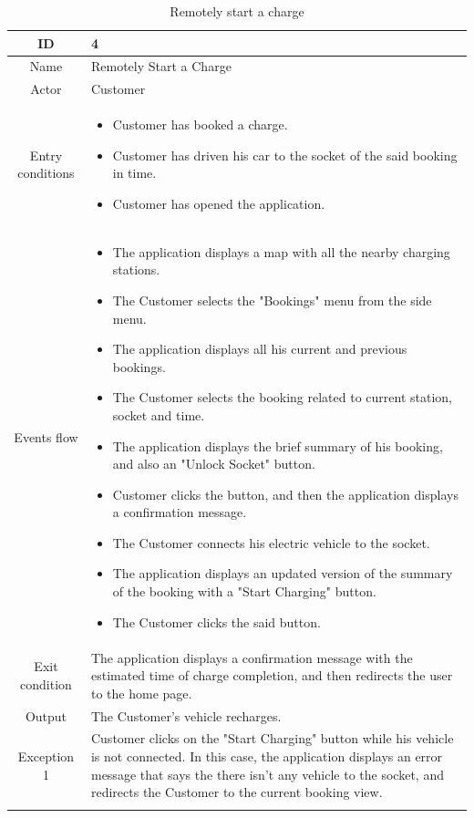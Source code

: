 \begin{longtable}{|c| p{10cm}|}
    \hline ID        & 4\\
    \hline
    Name     & Remotely Start a Charge \\
    \hline
    Actor            & Customer\\
    \hline
    Entry conditions & \begin{itemize}[nosep,after=\strut]
        \item Customer has booked a charge.
        \item Customer has driven his car to the socket of the said booking in time.
        \item Customer has opened the application.
    \end{itemize}
        \\
    \hline
    Events flow      & \begin{itemize}[nosep,after=\strut]
        \item The application displays a map with all the nearby charging stations.
        \item The Customer selects the "Bookings" menu from the side menu.
        \item The application displays all his current and previous bookings.
        \item The Customer selects the booking related to current station, socket and time.
        \item The application displays the brief summary of his booking, and also an "Unlock Socket" button.
        \item Customer clicks the button, and then the application displays a confirmation message. 
        \item The Customer connects his electric vehicle to the socket.
        \item The application displays an updated version of the summary of the booking with a "Start Charging" button.
        \item The Customer clicks the said button.
    \end{itemize}\\
    \hline
    Exit condition   & The application displays a confirmation message with the estimated time of charge completion, and then redirects the user to the home page.\\
    \hline
    Output           &  The Customer's vehicle recharges.
    \\
    \hline
    \hline
    Exception 1      &  Customer clicks on the "Start Charging" button while his vehicle is not connected. In this case, the application displays an error message that says the there isn't any vehicle to the socket, and redirects the Customer to the current booking view. \\
    \hline
    \caption{Remotely start a charge}\\
\end{longtable}
